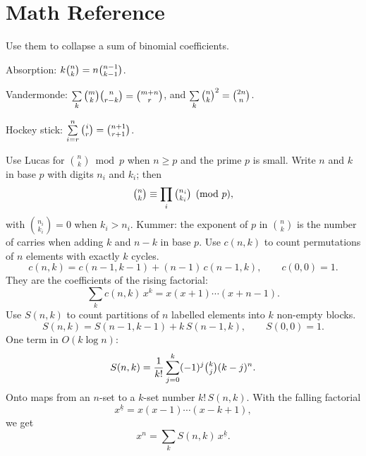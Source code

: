 \section{Math Reference}
\twolevels
{}

\label{mathcount}
{\footnotesize\tightdisplay
{}
Use them to collapse a sum of binomial coefficients.
\begin{facts}
	\item Absorption: $k \tbinom{n}{k} = n \tbinom{n-1}{k-1}$.
	\item Vandermonde: $\sum\limits_{k} \tbinom{m}{k} \tbinom{n}{r-k} = \tbinom{m+n}{r}$, and $\sum\limits_{k} \tbinom{n}{k}^2 = \tbinom{2n}{n}$.
	\item Hockey stick: $\sum\limits_{i=r}^{n} \tbinom{i}{r} = \tbinom{n+1}{r+1}$.
\end{facts}
Use Lucas for $\binom{n}{k} \bmod p$ when $n \ge p$ and the prime $p$ is small.
Write $n$ and $k$ in base $p$ with digits $n_i$ and $k_i$; then
\[ \tbinom{n}{k} \equiv \prod_i \tbinom{n_i}{k_i} \pmod p, \]
with $\binom{n_i}{k_i} = 0$ when $k_i > n_i$.
Kummer: the exponent of $p$ in $\binom{n}{k}$ is the number of carries
when adding $k$ and $n - k$ in base $p$.
Use $c(n, k)$ to count permutations of $n$ elements with exactly $k$ cycles.
\[ c(n, k) = c(n-1, k-1) + (n-1)\, c(n-1, k), \qquad c(0, 0) = 1. \]
They are the coefficients of the rising factorial:
\[ \sum_k c(n, k)\, x^k = x(x+1)\cdots(x+n-1). \]
Use $S(n, k)$ to count partitions of $n$ labelled elements into $k$ non-empty blocks.
\[ S(n, k) = S(n-1, k-1) + k\, S(n-1, k), \qquad S(0, 0) = 1. \]
One term in $O(k \log n)$:
\[ S(n, k) = \frac{1}{k!} \sum_{j=0}^{k} (-1)^j \tbinom{k}{j} (k-j)^n. \]
Onto maps from an $n$-set to a $k$-set number $k!\, S(n, k)$. With the falling factorial
\[ x^{\underline{k}} = x(x-1)\cdots(x-k+1), \]
we get
\[ x^n = \sum_k S(n, k)\, x^{\underline{k}}. \]

}
